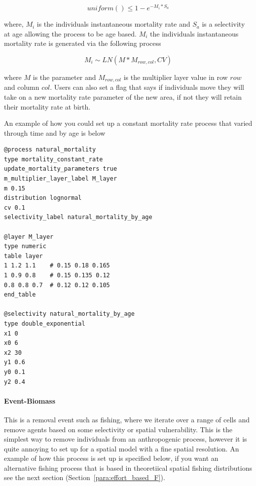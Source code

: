 \begin{equation}\label{constan_mort}
uniform() \leq 1 - e^{-M_i * S_a}
\end{equation}

where, $M_i$ is the individuals instantaneous mortality rate and $S_a$ is a selectivity at age allowing the process to be age based. $M_i$ the individuals instantaneous mortality rate is generated via the following process

\begin{equation}\label{constan_mort_assign}
M_i \sim LN(M * M_{row,col}, CV)
\end{equation}

where $M$ is the parameter  and $M_{row,col}$ is the multiplier layer value in row $row$ and column $col$. Users can also set a flag that says if individuals move they will take on a new mortality rate parameter of the new area, if not they will retain their mortality rate at birth.

An example of how you could set up a constant mortality rate process that varied through time and by age is below

{\small{\begin{verbatim}
@process natural_mortality
type mortality_constant_rate
update_mortality_parameters true
m_multiplier_layer_label M_layer
m 0.15
distribution lognormal
cv 0.1
selectivity_label natural_mortality_by_age

@layer M_layer
type numeric
table layer
1 1.2 1.1    # 0.15 0.18 0.165
1 0.9 0.8    # 0.15 0.135 0.12
0.8 0.8 0.7  # 0.12 0.12 0.105
end_table

@selectivity natural_mortality_by_age
type double_exponential
x1 0
x0 6
x2 30
y1 0.6
y0 0.1
y2 0.4
\end{verbatim}}}

\paragraph{Event-Biomass}
This is a removal event such as fishing, where we iterate over a range of cells and remove agents based on some selectivity or spatial vulnerability. This is the simplest way to remove individuals from an anthropogenic process, however it is quite annoying to set up for a spatial model with a fine spatial resolution. An example of how this process is set up is specified below, if you want an alternative fishing process that is based in theoretiical spatial fishing distributions see the next section (Section~\ref{para:effort_based_F}).




